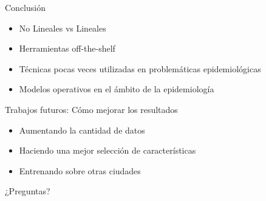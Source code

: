 \documentclass[10pt]{beamer}
\begin{document}
\begin{frame}{Conclusión}
  \begin{itemize}
    \item No Lineales vs Lineales

    \item Herramientas off-the-shelf

    \item Técnicas pocas veces utilizadas en problemáticas epidemiológicas

    \item Modelos operativos en el ámbito de la epidemiología
  \end{itemize}
\end{frame}

\begin{frame}{Trabajos futuros: Cómo mejorar los resultados}
      \begin{itemize}
        \item Aumentando la cantidad de datos
        \item Haciendo una mejor selección de características
        \item Entrenando sobre otras ciudades
      \end{itemize}
\end{frame}

\begin{frame}[standout]
  ¿Preguntas?
\end{frame}
\end{document}
